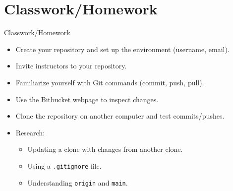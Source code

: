 \section{Classwork/Homework}
\begin{frame}{Classwork/Homework}
  \begin{itemize}
    \item Create your repository and set up the environment (username, email).
    \item Invite instructors to your repository.
    \item Familiarize yourself with Git commands (commit, push, pull).
    \item Use the Bitbucket webpage to inspect changes.
    \item Clone the repository on another computer and test commits/pushes.
    \item Research:
    \begin{itemize}
      \item Updating a clone with changes from another clone.
      \item Using a \texttt{.gitignore} file.
      \item Understanding \texttt{origin} and \texttt{main}.
    \end{itemize}
  \end{itemize}
\end{frame}

